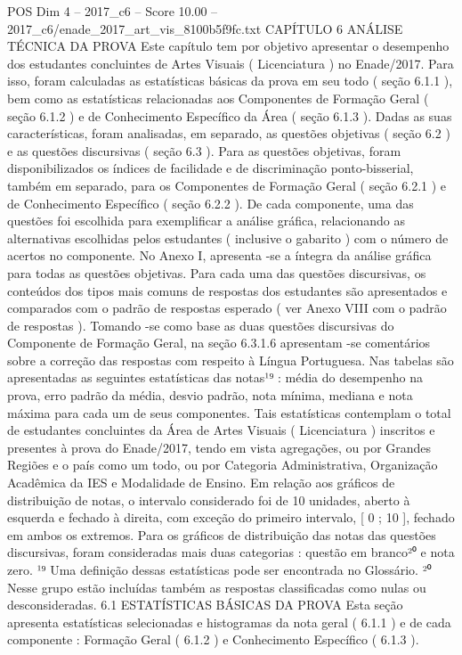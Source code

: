 \begin{textsample}{POS Dim 4 – 2017\_c6 – Score 10.00 – 2017\_c6/enade\_2017\_art\_vis\_8100b5f9fc.txt}  \label{ex:f4_pos_040}
CAPÍTULO 6 ANÁLISE TÉCNICA DA PROVA Este capítulo tem por objetivo apresentar o desempenho dos estudantes concluintes de Artes Visuais ( Licenciatura ) no Enade/2017.
Para isso, foram calculadas as estatísticas básicas da prova em seu todo ( seção 6.1.1 ), bem como as estatísticas relacionadas aos Componentes de Formação Geral ( seção 6.1.2 ) e de Conhecimento Específico da Área ( seção 6.1.3 ).
Dadas as suas características, foram analisadas, em separado, as questões objetivas ( seção 6.2 ) e as questões discursivas ( seção 6.3 ).
Para as questões objetivas, foram disponibilizados os índices de facilidade e de discriminação ponto-bisserial, também em separado, para os Componentes de Formação Geral ( seção 6.2.1 ) e de Conhecimento Específico ( seção 6.2.2 ).
De cada componente, uma das questões foi escolhida para exemplificar a análise gráfica, relacionando as alternativas escolhidas pelos estudantes ( inclusive o gabarito ) com o número de acertos no componente.
No Anexo I, apresenta -se a íntegra da análise gráfica para todas as questões objetivas.
Para cada uma das questões discursivas, os conteúdos dos tipos mais comuns de respostas dos estudantes são apresentados e comparados com o padrão de respostas esperado ( ver Anexo VIII com o padrão de respostas ).
Tomando -se como base as duas questões discursivas do Componente de Formação Geral, na seção 6.3.1.6 apresentam -se comentários sobre a correção das respostas com respeito à Língua Portuguesa.
Nas tabelas são apresentadas as seguintes estatísticas das notas¹⁹ : média do desempenho na prova, erro padrão da média, desvio padrão, nota mínima, mediana e nota máxima para cada um de seus componentes.
Tais estatísticas contemplam o total de estudantes concluintes da Área de Artes Visuais ( Licenciatura ) inscritos e presentes à prova do Enade/2017, tendo em vista agregações, ou por Grandes Regiões e o país como um todo, ou por Categoria Administrativa, Organização Acadêmica da IES e Modalidade de Ensino.
Em relação aos gráficos de distribuição de notas, o intervalo considerado foi de 10 unidades, aberto à esquerda e fechado à direita, com exceção do primeiro intervalo, [ 0 ; 10 ], fechado em ambos os extremos.
Para os gráficos de distribuição das notas das questões discursivas, foram consideradas mais duas categorias : questão em branco²⁰ e nota zero. ¹⁹ Uma definição dessas estatísticas pode ser encontrada no Glossário. ²⁰ Nesse grupo estão incluídas também as respostas classificadas como nulas ou desconsideradas. 6.1 ESTATÍSTICAS BÁSICAS DA PROVA Esta seção apresenta estatísticas selecionadas e histogramas da nota geral ( 6.1.1 ) e de cada componente : Formação Geral ( 6.1.2 ) e Conhecimento Específico ( 6.1.3 ).

\end{textsample}
